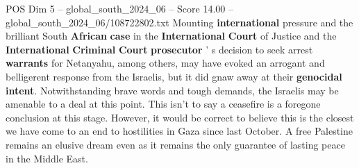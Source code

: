 \begin{textsample}{POS Dim 5 – global\_south\_2024\_06 – Score 14.00 – global\_south\_2024\_06/108722802.txt}
Mounting \textbf{international} pressure and the brilliant South \textbf{African} \textbf{case} in the \textbf{International} \textbf{Court} of Justice and the \textbf{International} \textbf{Criminal} \textbf{Court} \textbf{prosecutor} ' s decision to seek arrest \textbf{warrants} for Netanyahu, among others, may have evoked an arrogant and belligerent response from the Israelis, but it did gnaw away at their \textbf{genocidal} \textbf{intent}.
Notwithstanding brave words and tough demands, the Israelis may be amenable to a deal at this point.
This isn't to say a ceasefire is a foregone conclusion at this stage.
However, it would be correct to believe this is the closest we have come to an end to hostilities in Gaza since last October.
A free Palestine remains an elusive dream even as it remains the only guarantee of lasting peace in the Middle East.

\end{textsample}
